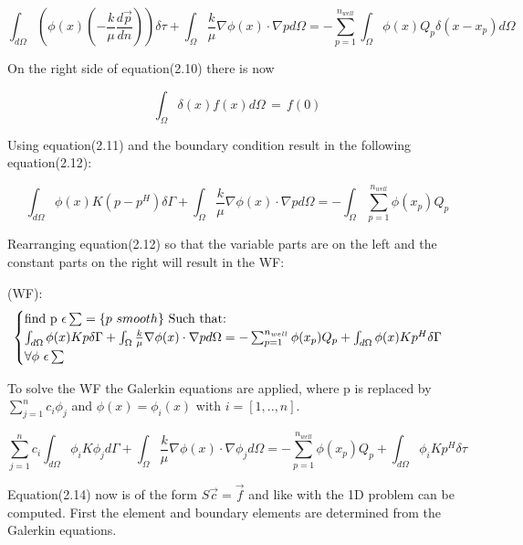 \documentclass{report}
\begin{document}
\begin{equation}
	\int_{d\Omega}(\phi(x)(-\frac{k}{\mu}\frac{d\vec{p}}{dn}))\delta\tau+\int_{\Omega}\frac{k}{\mu}\nabla\phi(x)\cdot\nabla p d\Omega= -\sum_{p=1}^{n_{well}}\int_{\Omega}\phi(x) Q_p\delta(x-x_p)d\Omega
\end{equation}


On the right side of equation(2.10) there is now 

\begin{equation}
	\int_{\Omega}\delta(x)f(x)d\Omega \, = \, f(0)	
\end{equation}

Using equation(2.11) and the boundary condition result in the following equation(2.12):

\begin{equation}
	\int_{d\Omega}\phi(x)K(p-p^H)\delta\Gamma+\int_{\Omega}\frac{k}{\mu}\nabla\phi(x)\cdot\nabla p d\Omega= -\int_{\Omega}\sum_{p=1}^{n_{well}}\phi(x_p) Q_p
\end{equation}	

Rearranging equation(2.12) so that the variable parts are on the left and the constant parts on the right will result in the WF: \vspace{5mm}


(WF): \begin{equation}
		\begin{cases} 
			$find p $\epsilon \sum =\{p$ $ smooth\}$ Such that:$ \\
			\int_{d\Omega}\phi(x)Kp\delta\Gamma+\int_{\Omega}\frac{k}{\mu}\nabla\phi(x)\cdot\nabla p d\Omega= -\sum_{p=1}^{n_{well}}\phi(x_p) Q_p +\int_{d\Omega}\phi(x)Kp^H\delta\Gamma\\ \forall\phi $ $ \epsilon\sum 
		\end{cases}\  
	\end{equation}

To solve the WF the Galerkin equations are applied, where p is replaced by $ \sum_{j=1}^{n}c_i\phi_j $ and  $\phi(x)=\phi_i(x)$ with $i = [1,..,n]$.

\begin{equation}
	\sum_{j=1}^{n}c_i\int_{d\Omega}\phi_i K\phi_j d\Gamma + \int_{\Omega}\frac{k}{\mu}\nabla\phi(x)\cdot\nabla \phi_j d\Omega= -\sum_{p=1}^{n_{well}}\phi(x_p) Q_p +\int_{d\Omega}\phi_i Kp^H\delta\tau
\end{equation}

Equation(2.14) now is of the form $S\vec{c}=\vec{f}$ and like with the 1D problem can be computed. First the element and boundary elements are determined from the Galerkin equations.
\end{document}
